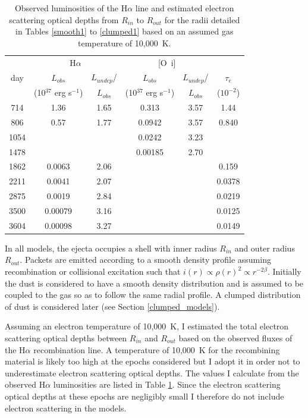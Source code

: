 \setlength{\tabcolsep}{10pt}
\begin{table}
\caption{Observed luminosities of the H$\alpha$ line and estimated 
electron scattering optical depths from $R_{in}$ to $R_{out}$ for the 
radii detailed in Tables \ref{smooth1} to \ref{clumped1} based on an 
assumed gas temperature of 10,000~K.}
\centering
\begin{tabular}{@{}cccccc@{}}
\hline
& \multicolumn{2}{c}{H$\alpha$} &  \multicolumn{2}{c}{[O~{\sc i}]}  \\
day &  $L_{obs}$ & $L_{undep}$/  &  $L_{obs}$ & $L_{undep}$/   & $\tau_e$ \\
& (10$^{37}$ erg s$^{-1}$) &$L_{obs}$& (10$^{37}$ erg s$^{-1}$) & $L_{obs}$& ($10^{-2}$) \\
\hline
714 & 1.36 & 1.65 &0.313&3.57& 1.44  \\
806 & 0.57 & 1.77 &0.0942&3.57& 0.840 \\
1054 &&&0.0242 & 3.23\\
1478 &&& 0.00185&2.70 \\
1862 & 0.0063 & 2.06 &&& 0.159  \\
2211 & 0.0041 & 2.07 &&& 0.0378  \\
2875 & 0.0019 & 2.84 & & &0.0219  \\
3500 & 0.00079 & 3.16 & &&0.0125  \\
3604 & 0.00098 & 3.27 &&&0.0149  \\

\hline
\end{tabular}

\label{tau_e}
\end{table}%
\setlength{\tabcolsep}{8pt}


In all models, the ejecta occupies a shell with inner radius $R_{in}$ and 
outer radius $R_{out}$.  Packets are emitted according to a smooth density 
profile assuming recombination or collisional excitation such that $i(r) 
\propto \rho(r)^2 \propto r^{-2\beta}$.  Initially the dust is considered 
to have a smooth density distribution and is assumed to be coupled to the 
gas so as to follow the same radial profile.  A clumped distribution of 
dust is considered later (see Section \ref{clumped_models}).

Assuming an electron temperature of 10,000~K, I estimated the total electron scattering optical depths between $R_{in}$ and $R_{out}$ based on the 
observed fluxes of the H$\alpha$ recombination line. A temperature of 10,000~K for the recombining material is 
likely too high at the epochs considered but I adopt it in order
not to underestimate electron scattering optical depths.  The values 
I calculate from the observed H$\alpha$ luminosities are listed in Table 
\ref{tau_e}.  Since the electron scattering optical depths at these epochs 
are negligibly small I therefore do not include electron scattering in 
the models.




